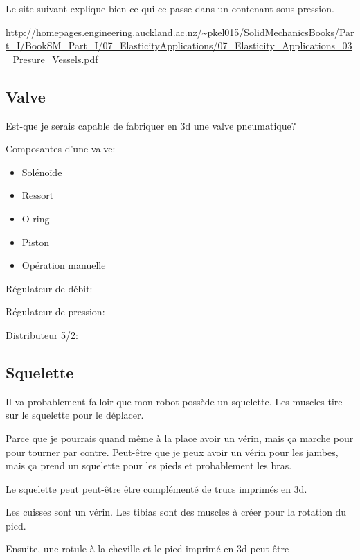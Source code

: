 \documentclass{article}
\begin{document}
Le site suivant explique bien ce qui ce passe dans un contenant sous-pression.

\url{http://homepages.engineering.auckland.ac.nz/~pkel015/SolidMechanicsBooks/Part_I/BookSM_Part_I/07_ElasticityApplications/07_Elasticity_Applications_03_Presure_Vessels.pdf}

\subsection{Valve}

Est-que je serais capable de fabriquer en 3d une valve pneumatique?

Composantes d'une valve:
\begin{itemize}
    \item Solénoïde
    \item Ressort
    \item O-ring
    \item Piston
    \item Opération manuelle
\end{itemize}


Régulateur de débit:

Régulateur de pression:

Distributeur 5/2:



\subsection{Squelette}

Il va probablement falloir que mon robot possède un squelette. Les muscles tire sur le squelette pour le déplacer.

Parce que je pourrais quand même à la place avoir un vérin, mais ça marche pour pour tourner par contre. Peut-être que je peux avoir un vérin pour les jambes, mais ça prend un squelette pour les pieds et probablement les bras.

Le squelette peut peut-être être complémenté de trucs imprimés en 3d.

Les cuisses sont un vérin. Les tibias sont des muscles à créer pour la rotation du pied.

Ensuite, une rotule à la cheville et le pied imprimé en 3d peut-être

\end{document}
